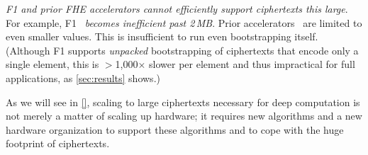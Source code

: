 \figBootstrappingFrequency

\emph{F1 and prior FHE accelerators cannot efficiently support ciphertexts this
large}. For example, F1~\cite{feldmann:micro21:f1} \emph{becomes inefficient
past 2\,MB}. Prior accelerators~\cite{riazi:asplos20:heax} are limited to even
smaller values. This is insufficient to run even bootstrapping itself.
(Although F1 supports \emph{unpacked} bootstrapping of ciphertexts that encode
only a single element, this is $>$1,000$\times$ slower per element and thus
impractical for full applications, as \autoref{sec:results} shows.)

As we will see in \autoref{}, scaling to large ciphertexts necessary for deep
computation is not merely a matter of scaling up hardware; it requires new
algorithms and a new hardware organization to support these algorithms and to
cope with the huge footprint of ciphertexts.

